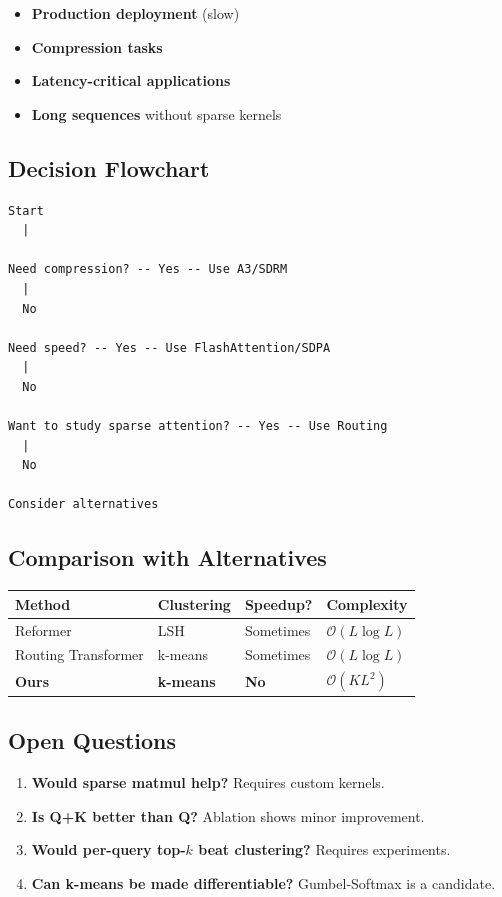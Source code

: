 \begin{itemize}
\item \textbf{Production deployment} (slow)
\item \textbf{Compression tasks}
\item \textbf{Latency-critical applications}
\item \textbf{Long sequences} without sparse kernels

\end{itemize}
\subsection{Decision Flowchart}

\begin{lstlisting}
Start
  |
   
Need compression? -- Yes -- Use A3/SDRM
  |
  No
   
Need speed? -- Yes -- Use FlashAttention/SDPA
  |
  No
   
Want to study sparse attention? -- Yes -- Use Routing
  |
  No
   
Consider alternatives
\end{lstlisting}

\subsection{Comparison with Alternatives}

\begin{table}[H]
\centering
\small
\begin{tabular}{llll}
\toprule
\textbf{Method} & \textbf{Clustering} & \textbf{Speedup?} & \textbf{Complexity} \\
\midrule
Reformer & LSH & Sometimes & $\mathcal{O}(L \log L)$ \\
Routing Transformer & k-means & Sometimes & $\mathcal{O}(L \log L)$ \\
\textbf{Ours} & \textbf{k-means} & \textbf{No} & \textbf{$\mathcal{O}(K L^2)$} \\
\bottomrule
\end{tabular}
\end{table}

\subsection{Open Questions}

\begin{enumerate}
\item \textbf{Would sparse matmul help?} Requires custom kernels.
\item \textbf{Is Q+K better than Q?} Ablation shows minor improvement.
\item \textbf{Would per-query top-$k$ beat clustering?} Requires experiments.
\item \textbf{Can k-means be made differentiable?} Gumbel-Softmax is a candidate.

\end{enumerate}
